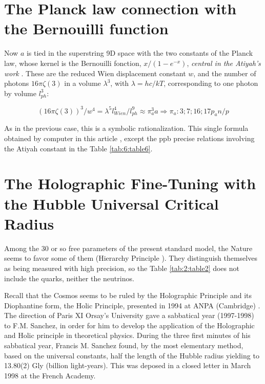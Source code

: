 \documentclass[a4paper,9pt]{article}
\begin{document}
\section{The Planck law connection with the Bernouilli function}

Now $a$ is tied in the superstring 9D space with the two constants of the Planck law, whose kernel is the Bernouilli fonction, $x/(1-e^{-x})$, \textit {central in the Atiyah's work} \cite{Atiyah}. These are the reduced Wien displacement constant $w$, and the number of photons $16\pi \zeta(3)$ in a volume $\lambda^3$, with $\lambda = hc/kT $, corresponding to one photon by volume $l_{ph}^3$:

\begin{equation}
(16\pi\zeta(3))^3/w^4 = \lambda^5l_{Wien}^4/l_{ph}^9 \approx \pi_a^3a    \Rightarrow     \pi_a: 3;7;16;17p_an/p
\end{equation}

As in the previous case, this is a symbolic rationalization. This single formula obtained by computer in this article \cite{LaGuer}, except the ppb precise relations involving the Atiyah constant in the Table \ref{tab:6:table6}.








\section{The Holographic Fine-Tuning with the Hubble Universal Critical Radius}

Among the 30 or so free parameters of the present standard model, the Nature seems to favor some of them (Hierarchy Principle \cite{Sanchez}). They distinguish themselves as being measured with high precision, so the Table \ref{tab:2:table2} does not include the quarks, neither the neutrinos. 

Recall that the Cosmos seems to be ruled by the Holographic Principle and its Diophantine form, the Holic Principle, presented in 1994 at ANPA (Cambridge)  \cite{Sanchez1}. The direction of Paris XI Orsay's University gave a sabbatical year (1997-1998) to F.M. Sanchez, in order for him to develop the application of the Holographic and Holic principle in theoretical physics. During the three first minutes of his sabbatical year, Francis M. Sanchez found, by the most elementary method, based on the universal constants, half the length of the Hubble radius yielding to 13.80(2) Gly (billion light-years). This was deposed in a closed letter in March 1998 at the French Academy. 
\end{document}
